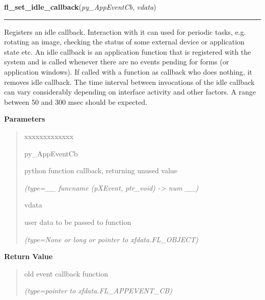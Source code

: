\hspace{.8\funcindent}\begin{boxedminipage}{\funcwidth}

    \raggedright \textbf{fl\_set\_idle\_callback}(\textit{py\_AppEventCb}, \textit{vdata})

    \vspace{-1.5ex}

    \rule{\textwidth}{0.5\fboxrule}
\setlength{\parskip}{2ex}
    Registers an idle callback. Interaction with it  can used for periodic 
    tasks, e.g. rotating an image, checking the status of some external 
    device or application state etc. An idle callback is an application 
    function that is registered with the system and is called whenever 
    there are no events pending for forms (or application windows). If 
    called with a function as callback who does nothing, it removes idle 
    callback. The time interval between invocations of the idle callback 
    can vary considerably depending on interface activity and other 
    factors. A range between 50 and 300 msec should be expected.

\setlength{\parskip}{1ex}
      \textbf{Parameters}
      \vspace{-1ex}

      \begin{quote}
        \begin{Ventry}{xxxxxxxxxxxxx}

          \item[py\_AppEventCb]

          python function callback, returning unused value

            {\it (type=\_\_ funcname (pXEvent, ptr\_void) -{\textgreater} num \_\_)}

          \item[vdata]

          user data to be passed to function

            {\it (type=None or long or pointer to xfdata.FL\_OBJECT)}

        \end{Ventry}

      \end{quote}

      \textbf{Return Value}
    \vspace{-1ex}

      \begin{quote}
      old event callback function

      {\it (type=pointer to xfdata.FL\_APPEVENT\_CB)}


\end{quote}
\end{boxedminipage}
